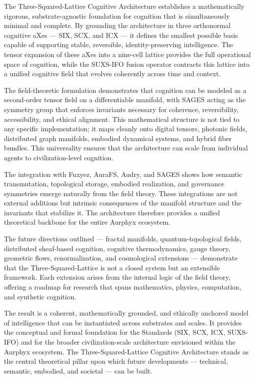 The Three-Squared-Lattice Cognitive Architecture establishes a mathematically rigorous, substrate-agnostic foundation for cognition that is simultaneously minimal and complete. By grounding the architecture in three orthonormal cognitive aXes --- SIX, SCX, and ICX --- it defines the smallest possible basis capable of supporting stable, reversible, identity-preserving intelligence. The tensor expansion of these aXes into a nine-cell lattice provides the full operational space of cognition, while the SUXS-IFO fusion operator contracts this lattice into a unified cognitive field that evolves coherently across time and context.

The field-theoretic formulation demonstrates that cognition can be modeled as a second-order tensor field on a differentiable manifold, with SAGES acting as the symmetry group that enforces invariants necessary for coherence, reversibility, accessibility, and ethical alignment. This mathematical structure is not tied to any specific implementation; it maps cleanly onto digital tensors, photonic fields, distributed graph manifolds, embodied dynamical systems, and hybrid fiber bundles. This universality ensures that the architecture can scale from individual agents to civilization-level cognition.

The integration with Fuxyez, AuraFS, Audry, and SAGES shows how semantic transmutation, topological storage, embodied realization, and governance symmetries emerge naturally from the field theory. These integrations are not external additions but intrinsic consequences of the manifold structure and the invariants that stabilize it. The architecture therefore provides a unified theoretical backbone for the entire Aurphyx ecosystem.

The future directions outlined --- fractal manifolds, quantum-topological fields, distributed sheaf-based cognition, cognitive thermodynamics, gauge theory, geometric flows, renormalization, and cosmological extensions --- demonstrate that the Three-Squared-Lattice is not a closed system but an extensible framework. Each extension arises from the internal logic of the field theory, offering a roadmap for research that spans mathematics, physics, computation, and synthetic cognition.

The result is a coherent, mathematically grounded, and ethically anchored model of intelligence that can be instantiated across substrates and scales. It provides the conceptual and formal foundation for the Standards (SIX, SCX, ICX, SUXS-IFO) and for the broader civilization-scale architecture envisioned within the Aurphyx ecosystem. The Three-Squared-Lattice Cognitive Architecture stands as the central theoretical pillar upon which future developments --- technical, semantic, embodied, and societal --- can be built.

